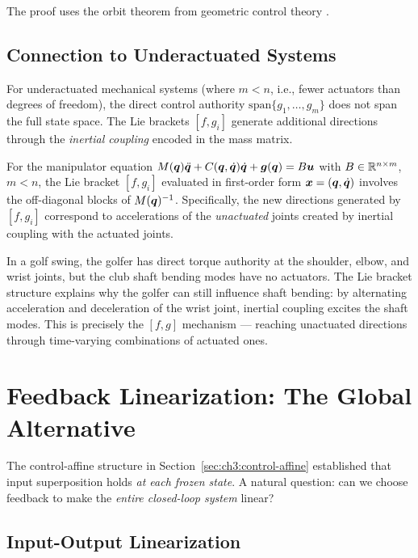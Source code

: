 The proof uses the orbit theorem from geometric control theory \cite{Isidori1995, Sastry1999}.

\subsection{Connection to Underactuated Systems}

For underactuated mechanical systems (where $m < n$, i.e., fewer actuators than
degrees of freedom), the direct control authority $\text{span}\{g_1, \ldots, g_m\}$
does not span the full state space. The Lie brackets $[f, g_i]$ generate additional
directions through the \emph{inertial coupling} encoded in the mass matrix.

For the manipulator equation $M(\bm{q})\ddot{\bm{q}} + C(\bm{q},\dot{\bm{q}})\dot{\bm{q}} + \bm{g}(\bm{q}) = B\bm{u}$
with $B \in \mathbb{R}^{n \times m}$, $m < n$, the Lie bracket $[f, g_i]$ evaluated in
first-order form $\bm{x} = (\bm{q}, \dot{\bm{q}})$ involves the off-diagonal blocks of $M(\bm{q})^{-1}$.
Specifically, the new directions generated by $[f, g_i]$ correspond to accelerations
of the \emph{unactuated} joints created by inertial coupling with the actuated joints.

\begin{laymansbox}
In a golf swing, the golfer has direct torque authority at the shoulder, elbow, and
wrist joints, but the club shaft bending modes have no actuators. The Lie bracket
structure explains why the golfer can still influence shaft bending: by alternating
acceleration and deceleration of the wrist joint, inertial coupling excites the shaft
modes. This is precisely the $[f, g]$ mechanism --- reaching unactuated directions
through time-varying combinations of actuated ones.
\end{laymansbox}


\section{Feedback Linearization: The Global Alternative}

The control-affine structure in Section~\ref{sec:ch3:control-affine} established
that input superposition holds \emph{at each frozen state}. A natural question: can
we choose feedback to make the \emph{entire closed-loop system} linear?

\subsection{Input-Output Linearization}

